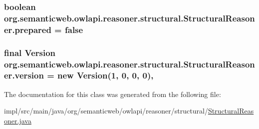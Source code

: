 \hypertarget{classorg_1_1semanticweb_1_1owlapi_1_1reasoner_1_1structural_1_1_structural_reasoner_ac1707645b4620d6a9b6615558bbe5ec0}{
\subsubsection[{prepared}]{\setlength{\rightskip}{0pt plus 5cm}boolean org.\-semanticweb.\-owlapi.\-reasoner.\-structural.\-Structural\-Reasoner.\-prepared = false\hspace{0.3cm}{\ttfamily [private]}}}\label{classorg_1_1semanticweb_1_1owlapi_1_1reasoner_1_1structural_1_1_structural_reasoner_ac1707645b4620d6a9b6615558bbe5ec0}
\hypertarget{classorg_1_1semanticweb_1_1owlapi_1_1reasoner_1_1structural_1_1_structural_reasoner_a790d96341137347399bc05f159a605ac}{
\subsubsection[{version}]{\setlength{\rightskip}{0pt plus 5cm}final {\bf Version} org.\-semanticweb.\-owlapi.\-reasoner.\-structural.\-Structural\-Reasoner.\-version = new {\bf Version}(1, 0, 0, 0)\hspace{0.3cm}{\ttfamily [static]}, {\ttfamily [private]}}}\label{classorg_1_1semanticweb_1_1owlapi_1_1reasoner_1_1structural_1_1_structural_reasoner_a790d96341137347399bc05f159a605ac}


The documentation for this class was generated from the following file\-:\begin{DoxyCompactItemize}
\item 
impl/src/main/java/org/semanticweb/owlapi/reasoner/structural/\hyperlink{_structural_reasoner_8java}{Structural\-Reasoner.\-java}\end{DoxyCompactItemize}
